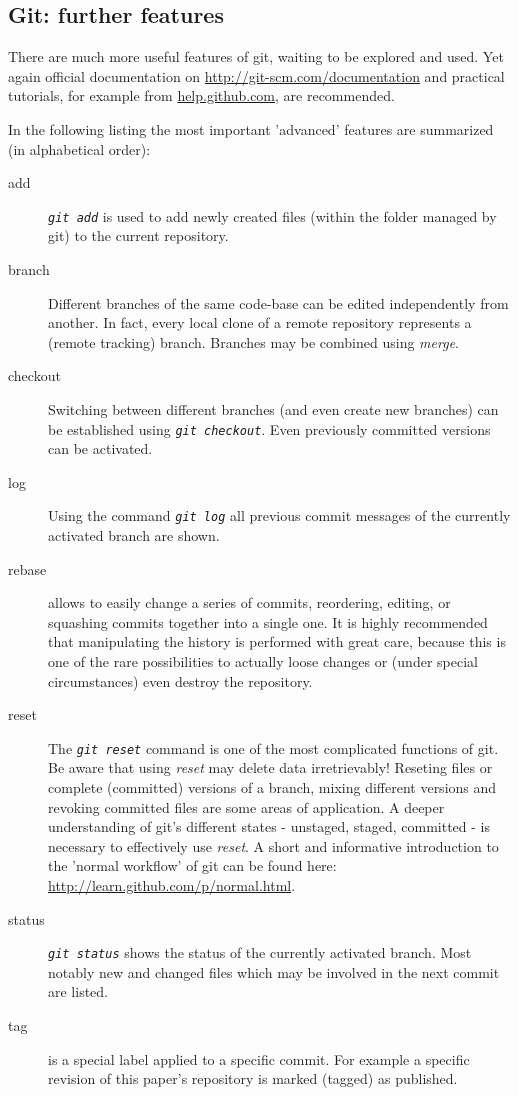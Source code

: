 \documentclass{ifacconf}
\begin{document}
\subsection{Git: further features}
There are much more useful features of git, waiting to be explored and used. Yet again
official documentation on \url{http://git-scm.com/documentation} and practical
tutorials, for example from \url{help.github.com}, are recommended.

In the following listing the most important 'advanced' features are summarized
(in alphabetical order):
\begin{description}
\item [add] \textit{\lstinline!git add!} is used to add newly created files (within the  folder managed by git) to the current repository.
\item [{branch}] Different branches of the same code-base can be edited independently from
another. In fact, every local clone of a remote repository represents a (remote tracking) 
branch. Branches may be combined using \textit{merge}.
\item [checkout] Switching between different branches (and even create new branches) can
be established using \textit{\lstinline!git checkout!}. Even previously committed versions
can be activated.
\item [log] Using the command \textit{\lstinline!git log!} all previous commit messages of
the currently activated branch are shown.
\item [{rebase}] allows to easily change a series of commits, reordering, editing, or squashing commits together into a single one. 
It is highly recommended that manipulating the history is performed with great care, because this is one of the 
rare possibilities to actually loose changes or (under special circumstances) even destroy the repository.
\item [reset] The \textit{\lstinline!git reset!} command is one of the most complicated
functions of git. Be aware that using \textit{reset} may delete data
irretrievably! Reseting files or complete (committed) versions
of a branch, mixing different versions and revoking committed files are some areas of application. 
A deeper understanding of git's different states -
unstaged, staged, committed - is necessary to effectively use \textit{reset}. A short
and informative introduction to the 'normal workflow' of git can be found here: \url{http://learn.github.com/p/normal.html}.
\item [status] \textit{\lstinline!git status!} shows the status of
the currently activated branch. Most notably new and changed files which may be involved
in the next commit are listed.
\item [tag] is a special label applied to a specific commit. For example a specific revision
of this paper's repository is marked (tagged) as published.
\end{description}
\end{document}
